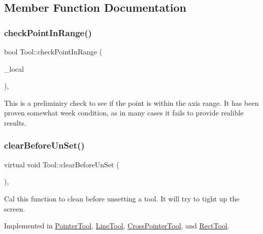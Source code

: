 \subsection{Member Function Documentation}
\mbox{\label{classTool_a81244366dc1b9f55465ed6f37b81033c}} 
\subsubsection{\texorpdfstring{check\+Point\+In\+Range()}{checkPointInRange()}}
{\footnotesize\ttfamily bool Tool\+::check\+Point\+In\+Range (\begin{DoxyParamCaption}\item[{const Q\+PointF \&}]{\+\_\+local }\end{DoxyParamCaption})\hspace{0.3cm}{\ttfamily [protected]}, {\ttfamily [inherited]}}

This is a preliminiry check to see if the point is within the axis range. It has been proven somewhat week condition, as in many cases it fails to provide realible results. \mbox{\label{classTool_a7d9e7d03f4a34d71850cbbfc16ca8532}} 
\subsubsection{\texorpdfstring{clear\+Before\+Un\+Set()}{clearBeforeUnSet()}}
{\footnotesize\ttfamily virtual void Tool\+::clear\+Before\+Un\+Set (\begin{DoxyParamCaption}{ }\end{DoxyParamCaption})\hspace{0.3cm}{\ttfamily [pure virtual]}, {\ttfamily [inherited]}}

Cal this function to clean before unsetting a tool. It will try to tight up the screen. 

Implemented in \mbox{\hyperlink{classPointerTool_a04c325128dc9ee27272eace9e70d15aa}{Pointer\+Tool}}, \mbox{\hyperlink{classLineTool_a2bcf5d5694e36445607c68c37e4f3f69}{Line\+Tool}}, \mbox{\hyperlink{classCrossPointerTool_a99e1b8f0669837dc5524c446e3dd401c}{Cross\+Pointer\+Tool}}, and \mbox{\hyperlink{classRectTool_a22ddb88797de61ed921a5cd3462383ea}{Rect\+Tool}}.



